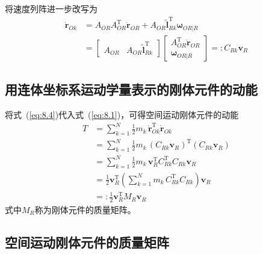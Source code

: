 将速度列阵进一步改写为
\begin{align}
\dot{\boldsymbol{r}}_{Ok} &= A_{OR}A_{OR}^{\mathrm{T}}\dot{\boldsymbol{r}}_{OR} + A_{OR}\tilde{\boldsymbol{l}}_{Rk}^{\mathrm{T}}\boldsymbol{\omega}_{OR|R} \nonumber\\
&= \begin{bmatrix}
A_{OR} & A_{OR}\tilde{\boldsymbol{l}}_{Rk}^{\mathrm{T}}
\end{bmatrix}
\begin{bmatrix}
A_{OR}^{\mathrm{T}}\dot{\boldsymbol{r}}_{OR} \\[2pt] \boldsymbol{\omega}_{OR|R}
\end{bmatrix}
=: C_{Rk}\boldsymbol{v}_R
\label{eq:8.4}
\end{align}

\subsection*{用连体坐标系运动学量表示的刚体元件的动能}

将式~(\ref{eq:8.4})代入式~(\ref{eq:8.1})，可得空间运动刚体元件的动能
\begin{align}
T &= \sum_{k=1}^{N} \frac{1}{2}m_k\,\dot{\boldsymbol{r}}_{Ok}^{\mathrm{T}}\dot{\boldsymbol{r}}_{Ok} \nonumber\\
&= \sum_{k=1}^{N} \frac{1}{2}m_k\,(C_{Rk}\boldsymbol{v}_R)^{\mathrm{T}}(C_{Rk}\boldsymbol{v}_R) \nonumber\\
&= \sum_{k=1}^{N} \frac{1}{2}m_k\,\boldsymbol{v}_R^{\mathrm{T}}C_{Rk}^{\mathrm{T}}C_{Rk}\boldsymbol{v}_R \nonumber\\
&= \frac{1}{2}\boldsymbol{v}_R^{\mathrm{T}}\left(\sum_{k=1}^{N} m_k\,C_{Rk}^{\mathrm{T}}C_{Rk}\right)\boldsymbol{v}_R \nonumber\\
&=: \frac{1}{2}\boldsymbol{v}_R^{\mathrm{T}}M_R\boldsymbol{v}_R
\label{eq:8.5}
\end{align}
式中$M_R$称为刚体元件的质量矩阵。

\subsection*{空间运动刚体元件的质量矩阵}

